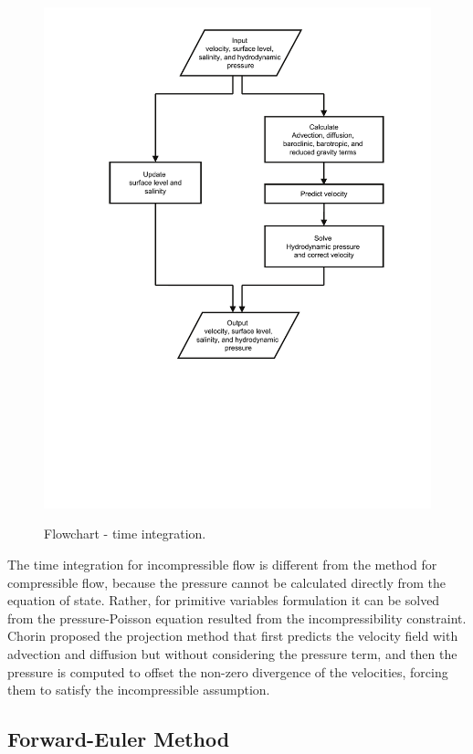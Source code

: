 \begin{figure}[htbp]
\hspace{0.25in}
\includegraphics[width=5.0in]{../figures/flowcharts/TimeIntegration-ForwardEuler-text.pdf}
\label{fig:flowchart-ForwardEuler-text}
\caption{Flowchart - time integration. }
\end{figure}

The time integration for incompressible flow is different from the method for compressible flow, because the pressure cannot be calculated directly from the equation of state. Rather, for primitive variables formulation it can be solved from the pressure-Poisson equation resulted from the incompressibility constraint. Chorin proposed the projection method \cite{Chorin1980} that first predicts the velocity field with advection and diffusion but without considering the pressure term, and then the pressure is computed to offset the non-zero divergence of the velocities, forcing them to satisfy the incompressible assumption.

\normalsize
\subsection{Forward-Euler Method}

